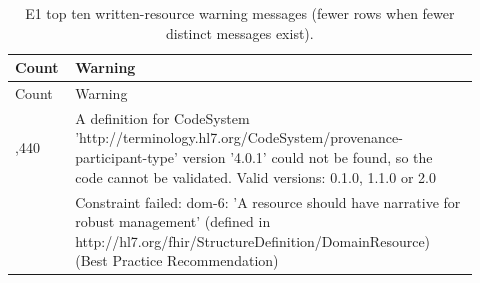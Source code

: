 \begingroup\small\setlength{\tabcolsep}{3pt}\renewcommand{\arraystretch}{1.15}
\begin{longtable}{>{\raggedright\arraybackslash}p{0.1\linewidth}>{\raggedright\arraybackslash}p{0.82\linewidth}}
\caption{E1 top ten written-resource warning messages (fewer rows when fewer distinct messages exist).}\label{sup:e1warnings}\\\hline
Count & Warning \\ \hline
\endfirsthead
\hline
Count & Warning \\ \hline
\endhead
\hline\endfoot
\hline\endlastfoot
1,440 & A definition for CodeSystem 'http:\allowbreak{}/\allowbreak{}/\allowbreak{}terminology.\allowbreak{}hl7.\allowbreak{}org/\allowbreak{}CodeSystem/\allowbreak{}provenance-\allowbreak{}participant-\allowbreak{}type' version '4.\allowbreak{}0.\allowbreak{}1' could not be found, so the code cannot be validated.\allowbreak{} Valid versions:\allowbreak{} 0.\allowbreak{}1.\allowbreak{}0, 1.\allowbreak{}1.\allowbreak{}0 or 2.\allowbreak{}0 \\
360 & Constraint failed:\allowbreak{} dom-\allowbreak{}6:\allowbreak{} 'A resource should have narrative for robust management' (defined in http:\allowbreak{}/\allowbreak{}/\allowbreak{}hl7.\allowbreak{}org/\allowbreak{}fhir/\allowbreak{}StructureDefinition/\allowbreak{}DomainResource) (Best Practice Recommendation) \\
\end{longtable}\endgroup
